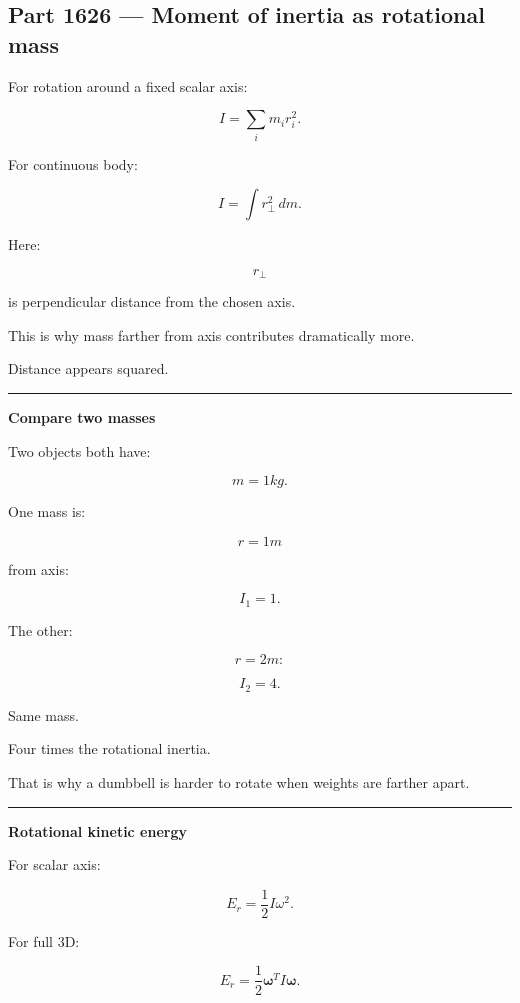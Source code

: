 \subsection{Part 1626 --- Moment of inertia as rotational mass}\label{06-engine-ii-ch035-part-1626-moment-of-inertia-as-rotational-mass}

\hypertarget{06-engine-ii-ch035-part-1626-moment-of-inertia-as-rotational-mass}{}

For rotation around a fixed scalar axis:

\[
\boxed{
I
=
\sum_i
m_ir_i^2.
}
\]

For continuous body:

\[
\boxed{
I
=
\int
r_\perp^2\,dm.
}
\]

Here:

\[
r_\perp
\]

is perpendicular distance from the chosen axis.

This is why mass farther from axis contributes dramatically more.

Distance appears squared.

\begin{center}\rule{0.5\linewidth}{0.5pt}\end{center}

\textbf{Compare two masses}

Two objects both have:

\[
m=1kg.
\]

One mass is:

\[
r=1m
\]

from axis:

\[
I_1=1.
\]

The other:

\[
r=2m:
\]

\[
I_2=4.
\]

Same mass.

Four times the rotational inertia.

That is why a dumbbell is harder to rotate when weights are farther apart.

\begin{center}\rule{0.5\linewidth}{0.5pt}\end{center}

\textbf{Rotational kinetic energy}

For scalar axis:

\[
E_r
=
\frac12I\omega^2.
\]

For full 3D:

\[
\boxed{
E_r
=
\frac12
\boldsymbol{\omega}^T
I
\boldsymbol{\omega}.
}
\]

